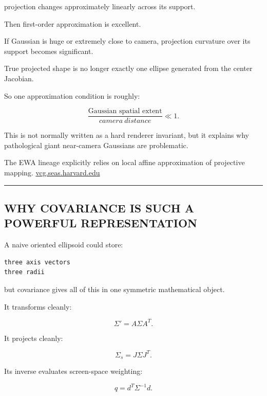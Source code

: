 projection changes approximately linearly across its support.

Then first-order approximation is excellent.

If Gaussian is huge or extremely close to camera, projection curvature over its support becomes significant.

True projected shape is no longer exactly one ellipse generated from the center Jacobian.

So one approximation condition is roughly:

\[
\boxed{
\frac{
\text{Gaussian spatial extent}
}{
camera\ distance
}
\ll1.
}
\]

This is not normally written as a hard renderer invariant, but it explains why pathological giant near-camera Gaussians are problematic.

The EWA lineage explicitly relies on local affine approximation of projective mapping. \href{https://vcg.seas.harvard.edu/content/3-publications/20020101-ewa-splatting/zwicker_ewa.pdf?utm_source=chatgpt.com}{vcg.seas.harvard.edu}

\begin{center}\rule{0.5\linewidth}{0.5pt}\end{center}

\subsection{WHY COVARIANCE IS SUCH A POWERFUL REPRESENTATION}\label{04-visual-computing-ii-ch038-why-covariance-is-such-a-powerful-representation}

\hypertarget{04-visual-computing-ii-ch038-why-covariance-is-such-a-powerful-representation}{}

A naive oriented ellipsoid could store:

\protect{}\label{nmuml2}%
\begin{verbatim}
three axis vectors
three radii
\end{verbatim}

but covariance gives all of this in one symmetric mathematical object.

It transforms cleanly:

\[
\Sigma'
=
A\Sigma A^T.
\]

It projects cleanly:

\[
\Sigma_s=
J\Sigma J^T.
\]

Its inverse evaluates screen-space weighting:

\[
q=
d^T\Sigma^{-1}d.
\]

